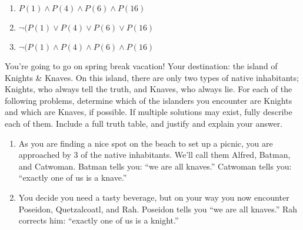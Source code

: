 \documentclass[11pt]{amsart}
\newcommand{\be}{\begin{enumerate}}
\newcommand{\ee}{\end{enumerate}}
\begin{document}
	\begin{sol}
		\begin{enumerate}
			\item $P(1) \wedge P(4) \wedge P(6) \wedge P(16)$
			\item $\neg(P(1) \vee P(4) \vee P(6) \vee P(16)$
			\item $\neg(P(1) \wedge P(4) \wedge P(6) \wedge P(16)$
		\end{enumerate}
	\end{sol}
\item You're going to go on spring break vacation! Your destination: the island of Knights \& Knaves. On this island, there are only two types of native inhabitants; Knights, who always tell the truth, and Knaves, who always lie.  For each of the following problems, determine which of the islanders you encounter are Knights and which are Knaves, if possible. If multiple solutions may exist, fully describe each of them. Include a full truth table, and justify and explain your answer.
	\be
	\item As you are finding a nice spot on the beach to set up a picnic, you are approached by 3 of the native inhabitants. We'll call them Alfred, Batman, and Catwoman.  Batman tells you: ``we are all knaves.'' Catwoman tells you: ``exactly one of us is a knave.''
	
	\item You decide you need a tasty beverage, but on your way you now encounter Poseidon, Quetzalcoatl, and Rah.  Poseidon tells you ``we are all knaves.'' Rah corrects him: ``exactly one of us is a knight.''
	\ee
	
\end{document}
